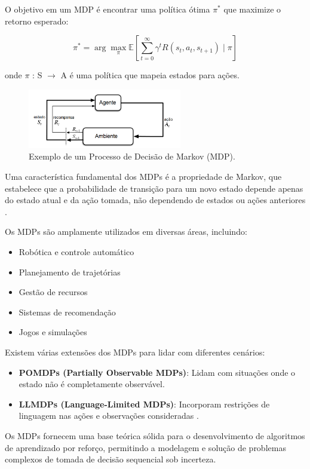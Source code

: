 O objetivo em um MDP é encontrar uma política ótima \(\pi^*\) que maximize o retorno esperado:

$$ \pi^* = \arg\max_\pi \mathbb{E}\left[\sum_{t=0}^{\infty} \gamma^t R(s_t, a_t, s_{t+1}) \mid \pi\right] $$

onde \(\pi\) : S \(\rightarrow\) A é uma política que mapeia estados para ações.

\begin{figure}[H]
 \centering
 \includegraphics[width=0.60\textwidth]{fig/MDP.png}
 \caption{Exemplo de um Processo de Decisão de Markov (MDP).}
 \label{fig:mdp_ilustracao}
\end{figure}

Uma característica fundamental dos MDPs é a propriedade de Markov, que estabelece que a probabilidade de transição para um novo estado depende apenas do estado atual e da ação tomada, não dependendo de estados ou ações anteriores \cite{sutton}.

Os MDPs são amplamente utilizados em diversas áreas, incluindo:

\begin{itemize}
\item Robótica e controle automático
\item Planejamento de trajetórias
\item Gestão de recursos
\item Sistemas de recomendação
\item Jogos e simulações
\end{itemize}

Existem várias extensões dos MDPs para lidar com diferentes cenários:

\begin{itemize}
\item \textbf{POMDPs (Partially Observable MDPs)}: Lidam com situações onde o estado não é completamente observável.
\item \textbf{LLMDPs (Language-Limited MDPs)}: Incorporam restrições de linguagem nas ações e observações consideradas \cite{introducao_modelos_probabilisticos}.
\end{itemize}

Os MDPs fornecem uma base teórica sólida para o desenvolvimento de algoritmos de aprendizado por reforço, permitindo a modelagem e solução de problemas complexos de tomada de decisão sequencial sob incerteza.

